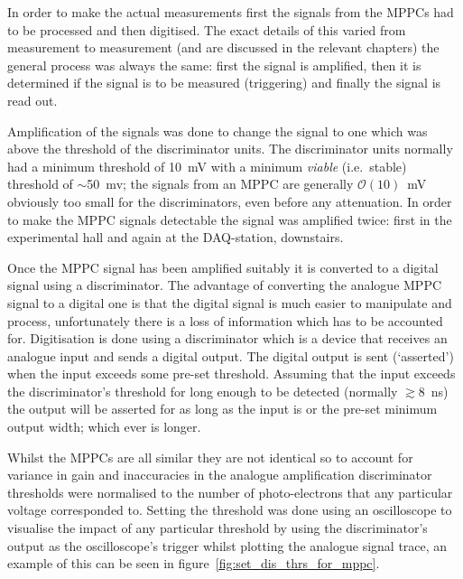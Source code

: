 
In order to make the actual measurements first the signals from the MPPCs had to be processed and then digitised. The exact details of this varied from measurement to measurement (and are discussed in the relevant chapters) the general process was always the same: first the signal is amplified, then it is determined if the signal is to be measured (triggering) and finally the signal is read out. 

Amplification of the signals was done to change the signal to one which was above the threshold of the discriminator units. The discriminator units normally had a minimum threshold of 10~mV with a minimum \emph{viable} (i.e.\ stable) threshold of \( \sim \)50~mv; the signals from an MPPC are generally \( \mathcal{O}(10) \)~mV obviously too small for the discriminators, even before any attenuation. In order to make the MPPC signals detectable the signal was amplified twice: first in the experimental hall and again at the DAQ-station, downstairs. 

Once the MPPC signal has been amplified suitably it is converted to a digital signal using a discriminator. The advantage of converting the analogue MPPC signal to a digital one is that the digital signal is much easier to manipulate and process, unfortunately there is a loss of information which has to be accounted for. Digitisation is done using a discriminator which is a device that receives an analogue input and sends a digital output. The digital output is sent (`asserted') when the input exceeds some pre-set threshold. Assuming that the input exceeds the discriminator's threshold for long enough to be detected (normally \(\gtrsim8\)~ns) the output will be asserted for as long as the input is or the pre-set minimum output width; which ever is longer. 

Whilst the MPPCs are all similar they are not identical so to account for variance in gain and inaccuracies in the analogue amplification discriminator thresholds were normalised to the number of photo-electrons that any particular voltage corresponded to. Setting the threshold was done using an oscilloscope to visualise the impact of any particular threshold by using the discriminator's output as the oscilloscope's trigger whilst plotting the analogue signal trace, an example of this can be seen in figure~\ref{fig:set_dis_thrs_for_mppc}.

